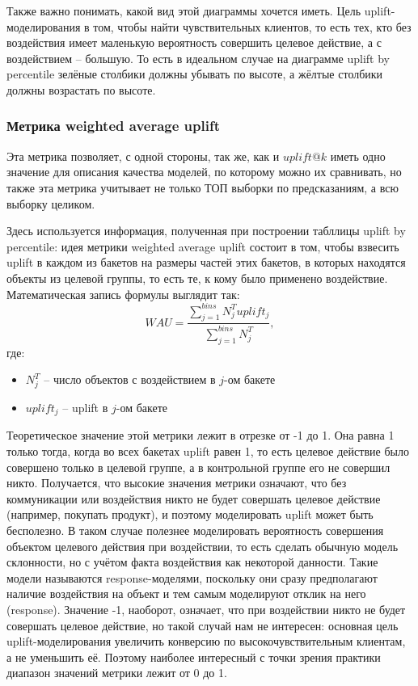 Также важно понимать, какой вид этой диаграммы хочется иметь. Цель uplift-моделирования в том, чтобы найти чувствительных клиентов, то есть тех, кто без воздействия имеет маленькую вероятность совершить целевое действие, а с воздействием -- большую. То есть в идеальном случае на диаграмме uplift by percentile зелёные столбики должны убывать по высоте, а жёлтые столбики должны возрастать по высоте.



\subsubsection*{Метрика weighted average uplift}

Эта метрика позволяет, с одной стороны, так же, как и $uplift@k$ иметь одно значение для описания качества моделей, по которому можно их сравнивать, но также эта метрика учитывает не только ТОП выборки по предсказаниям, а всю выборку целиком.

Здесь используется информация, полученная при построении табллицы uplift by percentile: идея метрики weighted average uplift состоит в том, чтобы взвесить uplift в каждом из бакетов на размеры частей этих бакетов, в которых находятся объекты из целевой группы, то есть те, к кому было применено воздействие. Математическая запись формулы выглядит так:
$$
    WAU = \frac{
        \sum\limits_{j=1}^{bins} N_j^T uplift_j
    }{
        \sum\limits_{j=1}^{bins} N_j^T
    }
    ,
$$
где:
\begin{itemize}
    \item $N_j^T$ -- число объектов с воздействием в $j$-ом бакете
    \item $uplift_j$ -- uplift в $j$-ом бакете
\end{itemize}

Теоретическое значение этой метрики лежит в отрезке от -1 до 1. Она равна 1 только тогда, когда во всех бакетах uplift равен 1, то есть целевое действие было совершено только в целевой группе, а в контрольной группе его не совершил никто. Получается, что высокие значения метрики означают, что без коммуникации или воздействия никто не будет совершать целевое действие (например, покупать продукт), и поэтому моделировать uplift может быть бесполезно. В таком случае полезнее моделировать вероятность совершения объектом целевого действия при воздействии, то есть сделать обычную модель склонности, но с учётом факта воздействия как некоторой данности. Такие модели называются response-моделями, поскольку они сразу предполагают наличие воздействия на объект и тем самым моделируют отклик на него (response). Значение -1, наоборот, означает, что при воздействии никто не будет совершать целевое действие, но такой случай нам не интересен: основная цель uplift-моделирования увеличить конверсию по высокочувствительным клиентам, а не уменьшить её. Поэтому наиболее интересный с точки зрения практики диапазон значений метрики лежит от 0 до 1.

